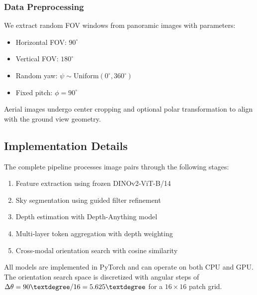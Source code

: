 \subsubsection{Data Preprocessing}

We extract random FOV windows from panoramic images with parameters:
\begin{itemize}
    \item Horizontal FOV: $90^\circ$
    \item Vertical FOV: $180^\circ$ 
    \item Random yaw: $\psi \sim \text{Uniform}(0^\circ, 360^\circ)$
    \item Fixed pitch: $\phi = 90^\circ$
\end{itemize}

Aerial images undergo center cropping and optional polar transformation to align with the ground view geometry.

\subsection{Implementation Details}

The complete pipeline processes image pairs through the following stages:
\begin{enumerate}
    \item Feature extraction using frozen DINOv2-ViT-B/14
    \item Sky segmentation using guided filter refinement
    \item Depth estimation with Depth-Anything model
    \item Multi-layer token aggregation with depth weighting
    \item Cross-modal orientation search with cosine similarity
\end{enumerate}

All models are implemented in PyTorch and can operate on both CPU and GPU. The orientation search space is discretized with angular steps of $\Delta\theta = 90\textdegree/16 = 5.625\textdegree$ for a $16 \times 16$ patch grid.